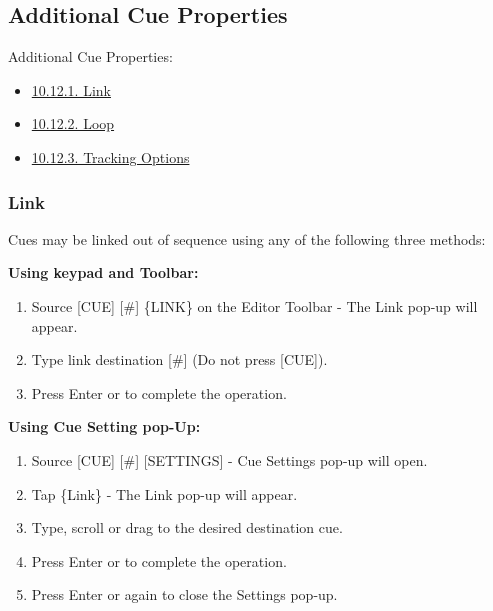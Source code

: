 \documentclass[
]{article}
\begin{document}
\hypertarget{additional-cue-properties}{%
\subsection{Additional Cue Properties}\label{additional-cue-properties}}

Additional Cue Properties:

\begin{itemize}
\item
  \hspace{0pt}\href{https://vibemanual.compulite.com/programming-cues-and-scenes.html\#link}{10.12.1. Link}\hspace{0pt}
\item
  \hspace{0pt}\href{https://vibemanual.compulite.com/programming-cues-and-scenes.html\#loop}{10.12.2. Loop}\hspace{0pt}
\item
  \hspace{0pt}\href{https://vibemanual.compulite.com/programming-cues-and-scenes.html\#tracking-options}{10.12.3. Tracking Options}
\end{itemize}

\hypertarget{link}{%
\subsubsection{Link}\label{link}}

Cues may be linked out of sequence using any of the following three methods:

\textbf{Using keypad and Toolbar:}

\begin{enumerate}
\def\labelenumi{\arabic{enumi}.}
\item
  Source {[}CUE{]} {[}\#{]} \{LINK\} on the Editor Toolbar - The Link pop-up will appear.
\item
  Type link destination {[}\#{]} (Do not press {[}CUE{]}).
\item
  Press Enter or \href{image.png}{} to complete the operation.
\end{enumerate}

\textbf{Using Cue Setting pop-Up:}

\begin{enumerate}
\def\labelenumi{\arabic{enumi}.}
\item
  Source {[}CUE{]} {[}\#{]} {[}SETTINGS{]} - Cue Settings pop-up will open.
\item
  Tap \{Link\} - The Link pop-up will appear.
\item
  Type, scroll or drag to the desired destination cue.
\item
  Press Enter or \href{image.png}{} to complete the operation.
\item
  Press Enter or \href{image.png}{} again to close the Settings pop-up.
\end{enumerate}
\end{document}
